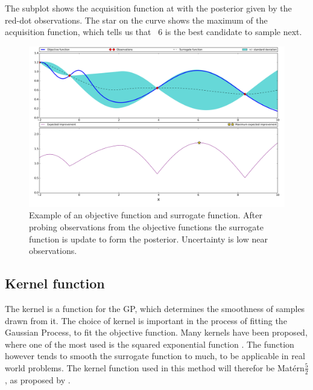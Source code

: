 The subplot shows the acquisition function at with the posterior given by the red-dot observations. The star on the curve shows the maximum of the acquisition function, which tells us that ~6 is the best candidate to sample next.
\begin{figure}%
	\centering
	\includegraphics[width=1\textwidth]{figures/BO.png}
	\vspace{-2em}
	\caption{Example of an objective function and surrogate function. After probing observations from the objective functions the surrogate function is update to form the posterior. Uncertainty is low near observations.}
	\label{fig:bayesian-optimization}
\end{figure}

\subsection{Kernel function}\label{sec:kernel-function}
The kernel is a function for the GP, which determines the smoothness of samples drawn from it. The choice of kernel is important in the process of fitting the Gaussian Process, to fit the objective function. Many kernels have been proposed, where one of the most used is the squared exponential function \citet{brochu2010tutorial}. The function however tends to smooth the surrogate function to much, to be applicable in real world problems. The kernel function used in this method will therefor be Matérn$\frac{5}{2}$, as proposed by \citet{snoek2012practical}.

